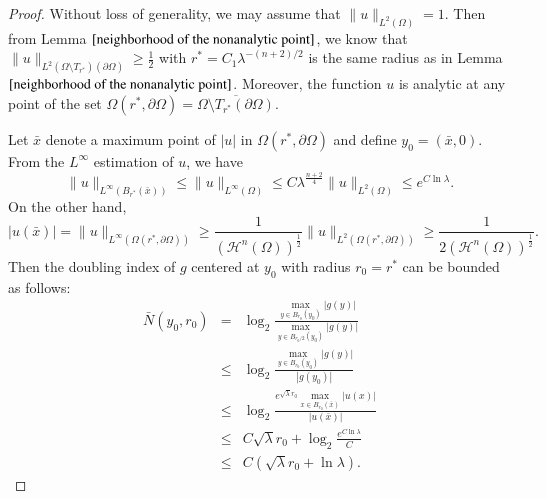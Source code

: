 \documentclass[a4paper, 12pt, onecolumn]{article} \textwidth 148mm
\begin{document}
\begin{proof}
Without loss of generality, we may assume that $\|u\|_{L^2(\Omega)}=1$. Then from Lemma $\ref{neighborhood of the nonanalytic point}$, we know that $\|u\|_{L^2(\Omega\setminus T_{r^*})(\partial\Omega)}\geq\frac{1}{2}$ with $r^*=C_1\lambda^{-(n+2)/2}$ is the same radius as in Lemma $\ref{neighborhood of the nonanalytic point}$.
Moreover, the function $u$ is analytic at any point of the set
$\Omega(r^*,\partial\Omega)=\overline{\Omega\setminus T_{r^*}(\partial\Omega)}$.

Let $\bar{x}$ denote a maximum point of $|u|$ in $\Omega(r^*,\partial\Omega)$ and define $y_0=(\bar{x},0)$.
From the $L^{\infty}$ estimation of $u$, we have
\begin{equation*}
\|u\|_{L^{\infty}(B_{r^*}(\bar{x}))}\leq \|u\|_{L^{\infty}(\Omega)}\leq C\lambda^{\frac{n+2}{4}}\|u\|_{L^2(\Omega)}\leq e^{C\ln\lambda}.
\end{equation*}
On the other hand,
\begin{equation*}
|u(\bar{x})|=\|u\|_{L^{\infty}(\Omega(r^*,\partial\Omega))}\geq \frac{1}{\left(\mathcal{H}^n(\Omega)\right)^{\frac{1}{2}}}\|u\|_{L^2(\Omega(r^*,\partial\Omega))}
\geq\frac{1}{2\left(\mathcal{H}^n(\Omega)\right)^{\frac{1}{2}}}.
\end{equation*}
Then the doubling index of $g$ centered at $y_0$ with radius $r_0=r^*$ can be bounded as follows:
\begin{eqnarray*}
\bar{N}(y_0,r_0)&=&\log_2\frac{\max\limits_{y\in B_{r_0}(y_0)}|g(y)|}{\max\limits_{y\in B_{r_0/2}(y_0)}|g(y)|}
\\&\leq&\log_2\frac{\max\limits_{y\in B_{r_0}(y_0)}|g(y)|}{|g(y_0)|}
\\&\leq&\log_2\frac{e^{\sqrt{\lambda}r_0}\max\limits_{x\in B_{r_0}(\bar{x})}|u(x)|}{|u(\bar{x})|}
\\&\leq&C\sqrt{\lambda}r_0+\log_2\frac{e^{C\ln\lambda}}{C}
\\&\leq&C(\sqrt{\lambda}r_0+\ln\lambda).
\end{eqnarray*}



\end{proof}
\end{document}
